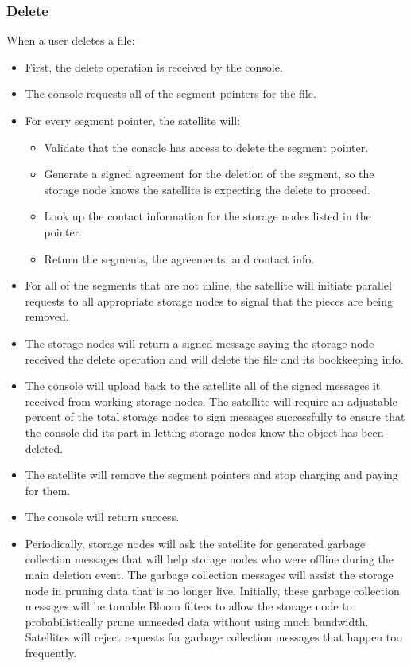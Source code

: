 \documentclass[a4paper,10pt]{article} \usepackage[utf8]{inputenc}
\begin{document}
\subsubsection{Delete}

When a user deletes a file:

\begin{itemize}
\item First, the delete operation is received by the console.
\item The console requests all of the segment pointers for the file.
\item For every segment pointer, the satellite will:
  \begin{itemize}
  \item Validate that the console has access to delete the segment pointer.
  \item Generate a signed agreement for the deletion of the segment, so the
    storage node knows the satellite is expecting the delete to proceed.
  \item Look up the contact information for the storage nodes listed in the
  pointer.
  \item Return the segments, the agreements, and contact info.
  \end{itemize}
\item For all of the segments that are not inline, the satellite will
  initiate parallel requests to all appropriate storage nodes to signal that the
  pieces are being removed.
\item The storage nodes will return a signed message saying the storage node
received
the
  delete operation and will delete the file and its bookkeeping info.
\item The console will upload back to the satellite all of the signed
  messages it received from working storage nodes. The satellite will require an
  adjustable percent of the total storage nodes to sign messages successfully
  to ensure that the console did its part in letting storage nodes know the
  object
  has been deleted.
\item The satellite will remove the segment pointers and stop charging and
  paying for them.
\item The console will return success.
\item Periodically, storage nodes will ask the satellite for generated garbage
  collection messages that will help storage nodes who were offline during the
  main
  deletion event.
  The garbage collection messages will assist the storage node in pruning data
  that is
  no longer live. Initially, these garbage collection messages will be tunable
  Bloom filters to allow the storage node to probabilistically prune unneeded
  data
  without using much bandwidth.
  Satellites will reject requests for garbage collection messages that
  happen too frequently.
\end{itemize}
\end{document}
